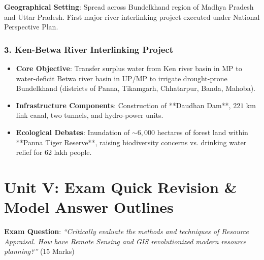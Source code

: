 \documentclass[11pt,a4paper]{article}
\begin{document}
\begin{casebox}
\textbf{Geographical Setting}: Spread across Bundelkhand region of Madhya Pradesh and Uttar Pradesh. First major river interlinking project executed under National Perspective Plan.
\end{casebox}

\subsubsection{3. Ken-Betwa River Interlinking Project}
\begin{itemize}[leftmargin=*]
  \item \textbf{Core Objective}: Transfer surplus water from Ken river basin in MP to water-deficit Betwa river basin in UP/MP to irrigate drought-prone Bundelkhand (districts of Panna, Tikamgarh, Chhatarpur, Banda, Mahoba).
  \item \textbf{Infrastructure Components}: Construction of **Daudhan Dam**, $221\text{ km}$ link canal, two tunnels, and hydro-power units.
  \item \textbf{Ecological Debates}: Inundation of $\sim 6,000$ hectares of forest land within **Panna Tiger Reserve**, raising biodiversity concerns vs. drinking water relief for 62 lakh people.
\end{itemize}

\newpage
\section{Unit V: Exam Quick Revision \& Model Answer Outlines}

\begin{exambox}
\textbf{Exam Question}: \textit{``Critically evaluate the methods and techniques of Resource Appraisal. How have Remote Sensing and GIS revolutionized modern resource planning?''} (15 Marks)
\end{exambox}
\end{document}
